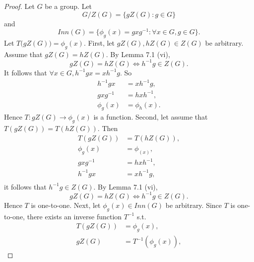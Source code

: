 \documentclass{article}
\newtheorem{theorem}{Theorem}[section]
\theoremstyle{definition}
\begin{document}
     \noindent{}
     
     \begin{proof}
        Let $G$ be a group. Let
        \begin{equation*}
            G/Z(G) = \{gZ(G):g \in G\}
        \end{equation*}
        and
        \begin{equation*}
            Inn(G) = \{\phi_g(x) = gxg^{-1}: \forall x \in G, g \in G\}. 
        \end{equation*}
        Let $T\big(gZ(G)\big) = \phi_g(x)$. First, let $gZ(G),hZ(G) \in Z(G)$ be arbitrary. Assume that $gZ(G)=hZ(G)$. By Lemma 7.1 (vi),
        \begin{equation*}
            gZ(G) = hZ(G) \iff h^{-1}g \in Z(G).
        \end{equation*}
        It follows that $\forall x \in G, h^{-1}gx = xh^{-1}g$. So
        \begin{align*}
            h^{-1}gx &= xh^{-1}g, \\
            gxg^{-1} &= hxh^{-1}, \\
            \phi_g(x) &= \phi_h(x).
        \end{align*}
        Hence $T: gZ(G) \to \phi_g(x)$ is a function. Second, let assume that $T(gZ(G)) = T(hZ(G))$. Then
        \begin{align*}
            T(gZ(G)) &= T(hZ(G)), \\
            \phi_g(x) &= \phi_(x), \\
            gxg^{-1} &= hxh^{-1}, \\
            h^{-1}gx &= xh^{-1}g, \\
        \end{align*}
        it follows that $h^{-1}g \in Z(G)$. By Lemma 7.1 (vi),
        \begin{equation*}
            gZ(G) = hZ(G) \iff h^{-1}g \in Z(G).
        \end{equation*}
        Hence $T$ is one-to-one. Next, let $\phi_g(x) \in Inn(G)$ be arbitrary. Since $T$ is one-to-one, there exists an inverse function $T^{-1}$ s.t.
        \begin{align*}
            T(gZ(G)) &= \phi_g(x), \\
            gZ(G) &= T^{-1}(\phi_g(x)),
        \end{align*}

\end{proof}
\end{document}
